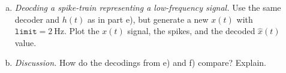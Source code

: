 \begin{enumerate}[a)]
\begin{itemize}
		\end{itemize}
		\item {} \textit{Deocding a spike-train representing a low-frequency signal.} Use the same decoder and $h(t)$ as in part e), but generate a new $x(t)$ with $\mathtt{limit}=\SI{2}{\hertz}$. Plot the $x(t)$ signal, the spikes, and the decoded $\hat{x}(t)$ value.
		\item {} \textit{Discussion.} How do the decodings from e) and f) compare? Explain.
	\end{enumerate}


